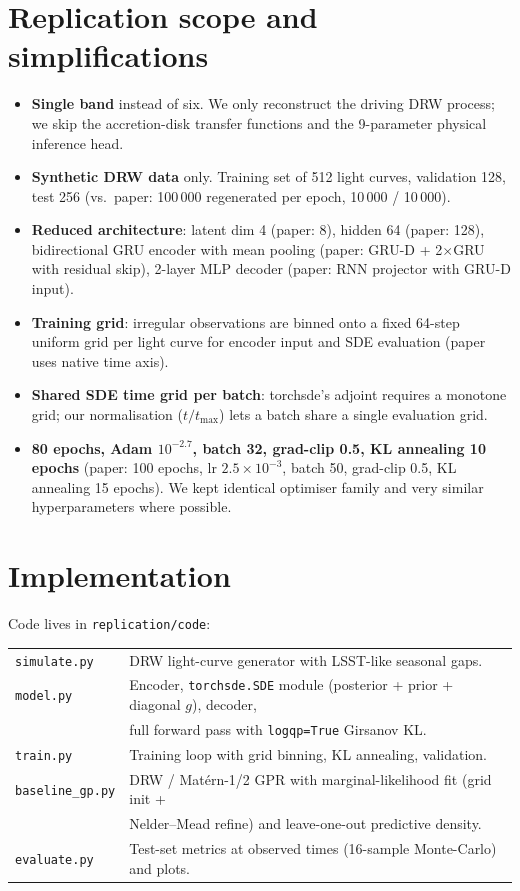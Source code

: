 \documentclass[11pt]{article}
\begin{document}
\section{Replication scope and simplifications}
\begin{itemize}\itemsep2pt
\item \textbf{Single band} instead of six. We only reconstruct the driving DRW process; we skip the
      accretion-disk transfer functions and the 9-parameter physical inference head.
\item \textbf{Synthetic DRW data} only. Training set of 512 light curves, validation 128, test 256
      (vs.\ paper: 100\,000 regenerated per epoch, 10\,000 / 10\,000).
\item \textbf{Reduced architecture}: latent dim 4 (paper: 8), hidden 64 (paper: 128), bidirectional
      GRU encoder with mean pooling (paper: GRU-D + 2$\times$GRU with residual skip), 2-layer MLP
      decoder (paper: RNN projector with GRU-D input).
\item \textbf{Training grid}: irregular observations are binned onto a fixed 64-step uniform grid per
      light curve for encoder input and SDE evaluation (paper uses native time axis).
\item \textbf{Shared SDE time grid per batch}: torchsde's adjoint requires a monotone grid; our
      normalisation ($t/t_{\max}$) lets a batch share a single evaluation grid.
\item \textbf{80 epochs, Adam $10^{-2.7}$, batch 32, grad-clip 0.5, KL annealing 10 epochs} (paper:
      100 epochs, lr $2.5{\times}10^{-3}$, batch 50, grad-clip 0.5, KL annealing 15 epochs). We kept
      identical optimiser family and very similar hyperparameters where possible.
\end{itemize}

\section{Implementation}
Code lives in \texttt{replication/code}:

\begin{tabular}{ll}
\toprule
\texttt{simulate.py}  & DRW light-curve generator with LSST-like seasonal gaps.\\
\texttt{model.py}     & Encoder, \texttt{torchsde.SDE} module (posterior + prior + diagonal $g$),
                        decoder, \\
                      & full forward pass with \texttt{logqp=True} Girsanov KL. \\
\texttt{train.py}     & Training loop with grid binning, KL annealing, validation. \\
\texttt{baseline\_gp.py} & DRW / Mat\'ern-1/2 GPR with marginal-likelihood fit (grid init + \\
                      & Nelder--Mead refine) and leave-one-out predictive density. \\
\texttt{evaluate.py}  & Test-set metrics at observed times (16-sample Monte-Carlo) and plots. \\
\bottomrule
\end{tabular}
\end{document}
